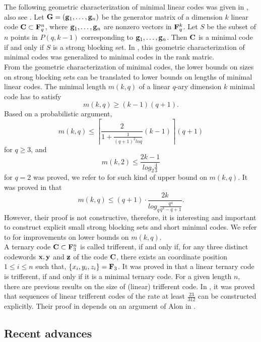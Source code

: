 \documentclass[12pt]{article}
\begin{document}
The following geometric characterization of minimal linear codes was given in \cite{Tang,Alfarano1}, also see \cite{Hegar,Alon}. Let ${\bf G}=({\bf g}_1,\ldots, {\bf g}_n)$ be the generator matrix of a dimension $k$ linear code ${\bf C} \subset {\bf F}_q^n$, where ${\bf g}_1, \ldots, {\bf g}_n$ are nonzero vectors in ${\bf F}_q^k$. Let $S$ be the subset of $n$ points in $P(q,k-1)$ corresponding to ${\bf g}_1, \ldots, {\bf g}_n$. Then ${\bf C}$ is a minimal code if and only if $S$ is a strong blocking set. In \cite{Alfarano2}, this geometric characterization of minimal codes was generalized to minimal codes in the rank matric.\\


From the geometric characterization of minimal codes, the lower bounds on sizes on strong blocking sets can be translated to lower bounds on lengths of minimal linear codes. The minimal length $m(k,q)$ of a linear $q$-ary dimension $k$ minimal code has to satisfy $$m(k,q) \geq (k-1)(q+1).$$ Based on a probabilistic argument, $$m(k,q) \leq \left\lceil \frac{2}{1+\frac{1}{(q+1)^2ln q}}(k-1)\right\rceil (q+1)$$ for $q \geq 3$, and $$m(k,2) \leq \frac{2k-1}{log_2\frac{4}{3}}$$ for $q=2$ was proved, we refer to \cite{Mik,Alfarano3,Bishnoi,Hegar} for such kind of upper bound on $m(k,q)$. It was proved in \cite{Bishnoi} that $$m(k,q) \leq (q+1) \cdot \frac{2k}{log_q\frac{q^4}{q^3-q+1}}.$$ However, their proof is not constructive, therefore, it is interesting and important to construct explicit small strong blocking sets and short minimal codes. We refer to \cite{Scotti} for improvements on lower bounds on $m(k,q)$. \\


A ternary code ${\bf C} \subset {\bf F}_3^n$ is called trifferent, if and only if, for any three distinct codewords ${\bf x}, {\bf y} $ and ${\bf z}$ of the code ${\bf C}$, there exists an coordinate position $1\leq i \leq n$ such that, $\{x_i,y_i,z_i\}={\bf F}_3$. It was proved in \cite{Bishnoi} that a linear ternary code is trifferent, if and only if it is a minimal ternary code. For a given length $n$, there are previous results on the size of (linear) trifferent code. In \cite[Theorem 1.7]{Bishnoi}, it was proved that sequences of linear trifferent codes of the rate at least $\frac{23}{312}$ can be constructed explicitly. Their proof in \cite{Bishnoi} depends on an argument of Alon in \cite{Alon1}.\\




\subsection{Recent advances}
\end{document}
